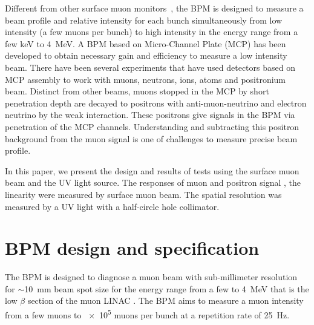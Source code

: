 \documentclass[preprint,3p,twocolumn]{elsarticle}
\begin{document}
Different from other surface muon monitors~\cite{muon_bpm1, muon_bpm3}, the BPM is designed to measure a beam profile 
and relative intensity for each bunch simultaneously from low intensity (a few muons per bunch) to high intensity in the energy range from a few \si{keV} to \SI{4}{\MeV}.
A BPM based on Micro-Channel Plate (MCP) has been developed to obtain necessary gain and efficiency to measure a low intensity beam.
There have been several experiments that have used detectors based on MCP assembly to work with muons, neutrons, ions, atoms and positronium~\cite{muon_bpm2, neutron, Ps} beam.
Distinct from other beams, muons stopped in the MCP by short penetration depth are decayed to positrons with anti-muon-neutrino and electron neutrino by the weak interaction. These positrons give signals in the BPM via penetration of the MCP channels. 
Understanding and subtracting this positron background from the muon signal is one of challenges to measure precise beam profile. %

In this paper, we present the design and results of tests using the surface muon beam and the UV light source.
The responses of muon and positron signal%
, the linearity %
were measured by surface muon beam.
The spatial resolution was measured by a UV light with a half-circle hole collimator.


\section{BPM design and specification}

The BPM is designed to diagnose a muon beam with %
sub-millimeter resolution for $\sim$\SI{10}{\mm} beam spot size for the energy range from a few to \SI{4}{\MeV} that is the low $\beta$ section of the muon LINAC \cite{IH}.
The BPM aims to measure a muon intensity from a few muons to \num{e5} muons per bunch at a repetition rate of \SI{25}{\hertz}. %
\end{document}
